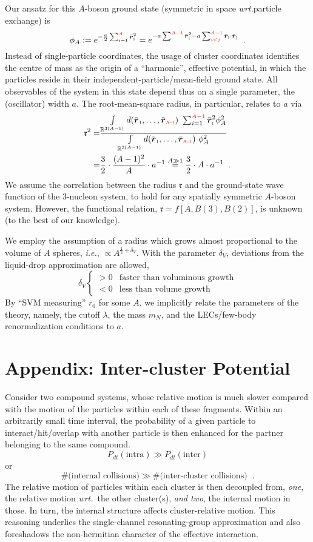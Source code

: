 \documentclass
[aps,nofootinbib,prl,showpacs,twocolumn,groupedaddress,superscriptaddress]
{revtex4}
\newcommand{\red}[1]{\textcolor{red}{#1}}
\newcommand{\la}{\label}
\newcommand{\be}{\begin{equation}}
\newcommand{\ee}{\end{equation}}
\newcommand{\vcl}[1]{\ensuremath{\bar{\boldsymbol{r}}_\text{\tiny #1}}}
\newcommand{\ie}{\textit{i.e.}\;}
\newcommand{\wrt}{\textit{wrt.}\;}
\begin{document}
Our ansatz for this $A$-boson ground state
(symmetric in space \wrt particle exchange) is
\be
\phi_A:=e^{-\frac{a}{2}\sum_{i=1}^{\red{A}}\vcl{i}^2}=e^{-a\sum^{\red{A-1}}\vcl{i}^2-a\sum^{\red{A-1}}_{\red{i<j}}\vcl{i}\cdot\vcl{j}}\la{eq.wfktphi}\;\;.
\ee
Instead of single-particle coordinates, the usage of cluster coordinates identifies
the centre of mass as the origin of a ``harmonic'', effective potential, in which the
particles reside in their independent-particle/mean-field ground state. All observables
of the system in this state depend thus on a single
parameter, the (oscillator) width $a$. The root-mean-square radius, in particular, relates to
$a$ via
\begin{align}
\mathfrak{r}^2=&\frac{\int\limits_{\mathbb{R}^{3(A-1)}}d(\vcl{1},\ldots,\vcl{\red{A-1}})~
\sum_{i=1}^{\red{A-1}}\vcl{i}^2\phi_A^2}
{\int\limits_{\mathbb{R}^{3(A-1)}}d(\vcl{1},\ldots,\vcl{\red{A-1}})~\phi_A^2}\\
=&\frac{3}{2}\cdot\frac{(A-1)^2}{A}\cdot a^{-1}\stackrel{A\gg 1}{=}
\frac{3}{2}\cdot A\cdot a^{-1}\;\;.
\end{align}
We assume the correlation between the radius $\mathfrak{r}$ and the ground-state wave function of the
$3$-nucleon system, to hold for any spatially symmetric $A$-boson system. However, the functional
relation, $\mathfrak{r}=f\left[A,B(3),B(2)\right]$, is unknown (to the best of our knowledge).

We employ the assumption of a radius which grows almost proportional to the volume of
$A$ spheres, \ie, $\propto A^{\frac{1}{3}+\delta_V}$.
With the parameter $\delta_V$, deviations from the liquid-drop approximation are allowed,
$$
\delta_V\left\lbrace
\begin{array}{cl} >0 & \text{faster than voluminous growth}\\ 
                 <0 & \text{less than volume growth}
\end{array}\right.
$$
By ``SVM measuring'' $r_0$ for some $A$, we
implicitly relate the parameters of the theory, namely, the cutoff $\lambda$, the mass $m_N$, and
the LECs/few-body renormalization conditions to $a$.

\newpage
\section{Appendix: Inter-cluster Potential}
Consider two compound systems, whose relative motion is much slower compared with the
motion of the particles within each of these fragments. Within an arbitrarily small
time interval, the probability of a given particle to interact/hit/overlap with another
particle is then enhanced for the partner belonging to the same compound.
\[P_{dt}(\text{intra})\gg P_{dt}(\text{inter})\]
or
\[\text{\#(internal collisions)}\gg\text{\#(inter-cluster collisions)}\;\;.\]
The relative motion of particles within each cluster is then decoupled from, {\it one}, the
relative motion \wrt~the other cluster(s), {\it and two}, the internal motion
in those. In turn, the internal structure affects cluster-relative motion.
This reasoning underlies the single-channel resonating-group approximation and
also foreshadows the non-hermitian character of the effective interaction.
\end{document}

